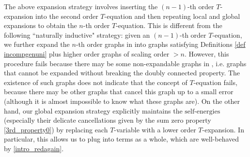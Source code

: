 \documentclass{article}
\newcommand{\1}{\mathds{1}}
\numberwithin{equation}{section}
\newcommand{\selfs}{\text{self-energies}}
\theoremstyle{plain} %
\theoremstyle{remark}
\newcommand{\cor}{\color{red}}
\newcommand{\Sdeltak}{{\Sigma}_{T,k}}
\newcommand{\incomp}{{\text{$T$-equation}}}
\newcommand{\AIT}{\mathcal A_{IT}}
\newcommand{\hty}[1]{{\cor (ht: #1) }}
\begin{document}

%
%
%


The above expansion strategy involves inserting the $(n-1)$-th order $T$-expansion into the second order $T$-equation and then repeating local and global expansions to obtain the $n$-th order $T$-equation. This is different from the following ``naturally inductive"  strategy:  given an $(n-1)$-th order $\incomp$, we further expand the $n$-th order graphs in \smash{$\AIT^{(>n-1)}$} into graphs satisfying Definitions \ref{def incompgenuni} plus higher order graphs of scaling order $>n$. However, this procedure fails because there may be some non-expandable graphs in \smash{$\AIT^{(>n-1)}$}, i.e. graphs that cannot be expanded without breaking the doubly connected property. %
The existence of such graphs does not indicate that the concept of $\incomp$ fails, because there may be other graphs that cancel this graph up to a small error (although it is almost impossible to know what these graphs are).  
On the other hand, our global expansion strategy explicitly maintains the $\selfs$ (especially their delicate cancellations given by the sum zero property \eqref{3rd_property0}) by replacing each $T$-variable with a lower order $T$-expansion. In particular, this allows us to plug into terms \smash{$ \left(\Theta \Sdeltak \Theta\right)_{xy} $} as a whole, which are well-behaved by \eqref{intro_redagain}. 
\end{document}

